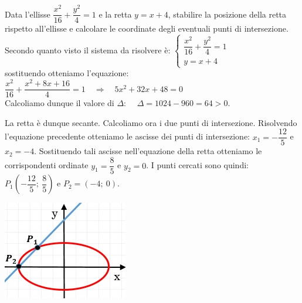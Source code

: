 \begin{esempio} Data l'ellisse $ \dfrac{x^{2}}{16}+  
\dfrac{y^{2}}{4} =1$ e la retta $y=x+4$, stabilire la posizione della retta 
rispetto all'ellisse e calcolare le coordinate degli eventuali punti di intersezione.\\[7pt] 
Secondo quanto visto il sistema da risolvere è:
$\begin{cases}  \dfrac{x^{2}}{16}+\dfrac{y^{2}}{4}=1   \\ y=x+4  
\end{cases}$ \\[4pt]
sostituendo otteniamo l'equazione: $ 
\dfrac{x^{2}}{16}+\dfrac{x^{2}+8x+16}{4}=1 \quad \Rightarrow \quad 5 
x^{2} +32x+48=0$\\[7pt]
Calcoliamo dunque il valore di $\Delta$: $\quad \Delta =1024-960=64>0$. \\[7pt]
\begin{minipage}{.65\textwidth}
\noindent La retta è dunque secante. Calcoliamo ora i due punti di 
intersezione. Risolvendo l'equazione precedente otteniamo le ascisse dei punti di 
intersezione: $ x_{1} =- \dfrac{12}{5} $ e $ x_{2} =-4$. Sostituendo tali 
ascisse nell'equazione della retta otteniamo le corrispondenti ordinate $ 
y_{1} =\dfrac{8}{5}$ e $ y_{2} =0$. I punti cercati sono quindi: $ P_{1}  
\left(-\dfrac{12}{5};~ \dfrac{8}{5}\right) $ e $ P_{2} =(-4;~0)$.
\end{minipage}
\hspace{0.5cm}
\begin{minipage}{.35\textwidth}
  \includegraphics[width=\textwidth]{img/esempioposizione1.jpg}
\end{minipage}
\end{esempio}
 
